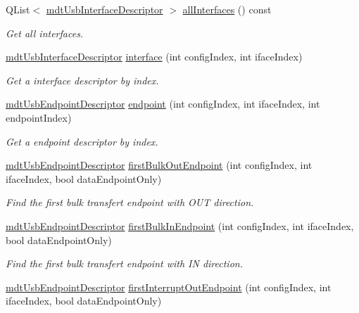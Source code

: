 \begin{DoxyCompactItemize}
Q\-List$<$ \hyperlink{classmdt_usb_interface_descriptor}{mdt\-Usb\-Interface\-Descriptor} $>$ \hyperlink{classmdt_usb_device_descriptor_ab196ef127e1c57f9d38960d120b746d2}{all\-Interfaces} () const 
\begin{DoxyCompactList}\small\item\em Get all interfaces. \end{DoxyCompactList}\item 
\hyperlink{classmdt_usb_interface_descriptor}{mdt\-Usb\-Interface\-Descriptor} \hyperlink{classmdt_usb_device_descriptor_aed8342e33c53501221a49b096d0a1fdc}{interface} (int config\-Index, int iface\-Index)
\begin{DoxyCompactList}\small\item\em Get a interface descriptor by index. \end{DoxyCompactList}\item 
\hyperlink{classmdt_usb_endpoint_descriptor}{mdt\-Usb\-Endpoint\-Descriptor} \hyperlink{classmdt_usb_device_descriptor_a2b5b593bf4a7d3a7a92a9b2ed1c19109}{endpoint} (int config\-Index, int iface\-Index, int endpoint\-Index)
\begin{DoxyCompactList}\small\item\em Get a endpoint descriptor by index. \end{DoxyCompactList}\item 
\hyperlink{classmdt_usb_endpoint_descriptor}{mdt\-Usb\-Endpoint\-Descriptor} \hyperlink{classmdt_usb_device_descriptor_afc461335d1ac65b994b94d1f98e0dfff}{first\-Bulk\-Out\-Endpoint} (int config\-Index, int iface\-Index, bool data\-Endpoint\-Only)
\begin{DoxyCompactList}\small\item\em Find the first bulk transfert endpoint with O\-U\-T direction. \end{DoxyCompactList}\item 
\hyperlink{classmdt_usb_endpoint_descriptor}{mdt\-Usb\-Endpoint\-Descriptor} \hyperlink{classmdt_usb_device_descriptor_a7ef9a49f04abb2fc6d82550718916373}{first\-Bulk\-In\-Endpoint} (int config\-Index, int iface\-Index, bool data\-Endpoint\-Only)
\begin{DoxyCompactList}\small\item\em Find the first bulk transfert endpoint with I\-N direction. \end{DoxyCompactList}\item 
\hyperlink{classmdt_usb_endpoint_descriptor}{mdt\-Usb\-Endpoint\-Descriptor} \hyperlink{classmdt_usb_device_descriptor_a2a66396c4cdd8c44fc64df74f83cba99}{first\-Interrupt\-Out\-Endpoint} (int config\-Index, int iface\-Index, bool data\-Endpoint\-Only)

\end{DoxyCompactItemize}
